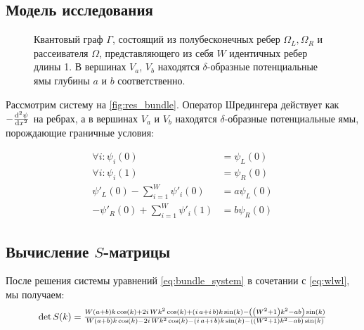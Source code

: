 \subsection{Модель исследования}
\begin{figure}
\centering
\begin{tikzpicture}[scale=1.1] %

\end{tikzpicture}
\caption{Квантовый граф $\Gamma$, состоящий из полубесконечных ребер $\Omega_L, \Omega_R$ и рассеивателя $\Omega$, представляющего из себя $W$ идентичных ребер длины 1. В вершинах $V_a$, $V_b$ находятся $\delta$-образные потенциальные ямы глубины $a$ и $b$ соответственно.}\label{fig:res_bundle}
\end{figure}

Рассмотрим систему на \autoref{fig:res_bundle}. Оператор Шредингера действует как $-\dv[2]{\psi}{x}$ на ребрах, а в вершинах $V_a$ и $V_b$ находятся $\delta$-образные потенциальные ямы, порождающие граничные условия:

\begin{equation}\label{eq:bundle_system}
\begin{aligned}
   \forall i: \psi_i(0) &= \psi_L(0)
\\ \forall i: \psi_i(1) &= \psi_R(0)
\\ \psi'_L(0) - \sum\limits_{i = 1}^W \psi'_i(0) &= a \psi_L(0)
\\ -\psi'_R(0) + \sum\limits_{i = 1}^W \psi'_i(1) &= b \psi_R(0)
\end{aligned}
\end{equation}

\subsection{Вычисление $S$-матрицы}
После решения системы уравнений \ref{eq:bundle_system} в сочетании с \ref{eq:wlwl}, мы получаем:
\begin{equation*}
\resizebox{0.85\hsize}{!}{$
\det S(k) = \frac{W {\left(a + b\right)} k \cos\left(k\right) + 2 i \, W k^{2} \cos\left(k\right) + {\left(i \, a + i \, b\right)} k \sin\left(k\right) - {\left({\left(W^{2} + 1\right)} k^{2} - a b\right)} \sin\left(k\right)}{W {\left(a + b\right)} k \cos\left(k\right) - 2 i \, W k^{2} \cos\left(k\right) - {\left(i \, a + i \, b\right)} k \sin\left(k\right) - {\left({\left(W^{2} + 1\right)} k^{2} - a b\right)} \sin\left(k\right)}
$}
\end{equation*}


